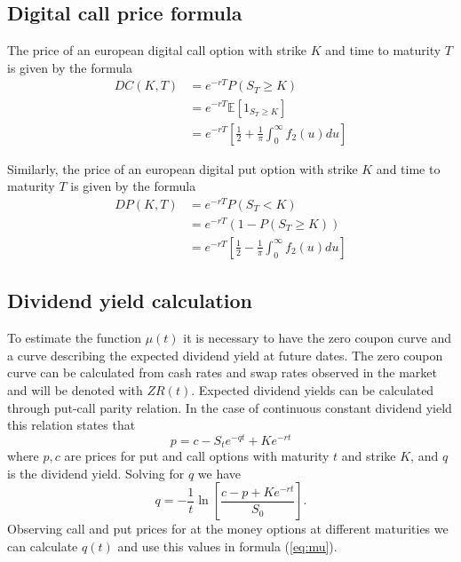 \subsection{Digital call price formula}
\label{digital}
The price of an european digital call option with strike $K$ and time to maturity $T$ is given by the formula
\begin{equation}
\begin{aligned}
DC(K,T) &= e^{-r T} P(S_T \geq K) \\ &=  e^{-r T} \mathbb{E}\left[1_{S_T \geq K}\right] \\
&= e^{-r T}  \left[ \frac{1}{2} + \frac{1}{\pi}\int_0^{\infty}f_2(u) du \right] 
\end{aligned}
\end{equation}

Similarly, the price of an european digital put option with strike $K$ and time to maturity $T$ is given by the formula
\begin{equation}
\begin{aligned}
DP(K,T) &= e^{-r T} P(S_T < K) \\ 
&= e^{-r T} (1-P(S_T \geq K))  \\ 
& = e^{-r T}  \left[  \frac{1}{2} - \frac{1}{\pi}\int_0^{\infty}f_2(u) du \right] 
\end{aligned} 
\end{equation}

\subsection{Dividend yield calculation}

To estimate the function $\mu(t)$ it is necessary to have the zero coupon curve and a curve describing the expected dividend yield at future dates. The zero coupon curve can be calculated from cash rates and swap rates observed in the market and will be denoted with $ZR(t)$. Expected dividend yields can be calculated through put-call parity relation. In the case of continuous constant dividend yield this relation states that
\begin{equation}
p = c -S_te^{-qt} + Ke^{-rt}
\end{equation}
where $p,c$ are prices for put and call options with maturity $t$ and strike $K$, and $q$ is the dividend yield. Solving for $q$ we have
\begin{equation}
q = -\frac{1}{t}\ln\left[\frac{c-p + Ke^{-rt}}{S_0}\right].
\end{equation}
Observing call and put prices for at the money options at different maturities we can calculate $q(t)$ and use this values in formula (\ref{eq:mu}).

